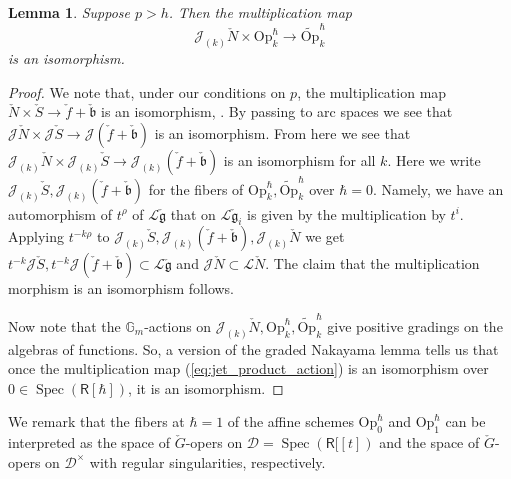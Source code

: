 \documentclass{amsart}
\newtheorem{Lem}[Thm]{Lemma}
\theoremstyle{definition}
\newcommand{\sss}{\subsubsection{}}
\newcommand{\D}{\sD}
\newcommand{\sD}{\mathscr{D}}
\newcommand{\on}{\mathrm}
\newcommand{\Ring}{\mathsf{R}}
\newcommand{\g}{\mathfrak{g}}
\newcommand{\Jet}{\mathscr{J}}
\newcommand{\Loop}{\mathscr{L}}
\newcommand{\Op}{\on{Op}}
\numberwithin{equation}{section}
\begin{document}
\begin{Lem}\label{Lem:Kostant_section}
Suppose $p>h$. Then the multiplication map
\begin{equation}\label{eq:jet_product_action}
\Jet_{(k)} \check{N}\times \Op^\hbar_k \rightarrow \widetilde{\Op}^\hbar_k 
\end{equation}
is an isomorphism.
\end{Lem}
\begin{proof}
We note that, under our conditions on $p$, the multiplication map $\check{N}\times \check{S}\rightarrow \check{f}+\check{\mathfrak{b}}$ is an isomorphism, \cite[Proposition 3.2.1]{Riche_Kostant}. By passing to arc spaces we see that $\Jet \check{N}\times \Jet \check{S}\rightarrow \Jet(\check{f}+\check{\mathfrak{b}})$ is an isomorphism. 
From here we see that $\Jet_{(k)} \check{N}\times \Jet_{(k)} \check{S}\rightarrow \Jet_{(k)}(\check{f}+\check{\mathfrak{b}})$ is an isomorphism for all $k$. Here we write 
$\Jet_{(k)} \check{S}, \Jet_{(k)}(\check{f}+\check{\mathfrak{b}})$ for the fibers of $\Op^\hbar_{k},\widetilde{\Op}^\hbar_{k}$ over $\hbar=0$.
Namely, we have an automorphism of $t^\rho$ of $ \Loop \check{\g}$ that on $\Loop \check{\g}_i$ is given by the multiplication by $t^i$. Applying $t^{-k\rho}$ to $\Jet_{(k)}\check{S}, 
\Jet_{(k)}(\check{f}+\check{\mathfrak{b}}),\Jet_{(k)} \check{N}$ we get 
$t^{-k}\Jet \check{S}, t^{-k}\Jet(\check{f}+\check{\mathfrak{b}})\subset \Loop \check{\g}$ and $\Jet \check{N}\subset \Loop \check{N}$. The claim that the multiplication morphism is an isomorphism follows.

Now note that the $\mathbb{G}_m$-actions on $\Jet_{(k)} \check{N},\Op^\hbar_k, \widetilde{\Op}^\hbar_k$ give positive gradings on the algebras of functions. So, a version of the graded Nakayama lemma tells us that once the multiplication map (\ref{eq:jet_product_action}) is an isomorphism  over $0\in \operatorname{Spec}(\Ring[\hbar])$, it is an isomorphism. 
\end{proof}

We remark that the fibers at $\hbar=1$ of the affine schemes $\Op^\hbar_0$
and $\Op^\hbar_1$ can be interpreted as the space of $\check{G}$-opers on
$\D=\operatorname{Spec}(\Ring[[t])$ and the space of $\check{G}$-opers on $\D^\times$ with regular singularities, respectively.

\sss 
\end{document}
